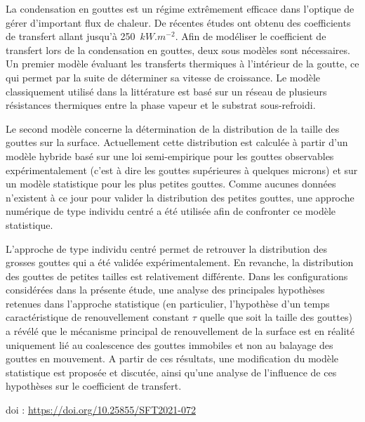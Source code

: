 {\normalsize
La condensation en gouttes est un régime extrêmement efficace dans l'optique de gérer d'important flux de chaleur. De récentes études ont obtenu des coefficients de transfert allant jusqu'à 250~$\unit{kW.m^{-2}}$. Afin de modéliser le coefficient de transfert lors de la condensation en gouttes, deux sous modèles sont nécessaires. Un premier modèle évaluant les transferts thermiques à l'intérieur de la goutte, ce qui permet par la suite de déterminer sa vitesse de croissance. Le modèle classiquement utilisé dans la littérature est basé sur un réseau de plusieurs résistances thermiques entre la phase vapeur et le substrat sous-refroidi. 



Le second modèle concerne la détermination de la distribution de la taille des gouttes sur la surface. Actuellement cette distribution est calculée à partir d'un modèle hybride basé sur une loi semi-empirique pour les gouttes observables expérimentalement (c'est à dire les gouttes supérieures à quelques microns) et sur un modèle statistique pour les plus petites gouttes. Comme aucunes données n'existent à ce jour pour valider la distribution des petites gouttes, une approche numérique de type individu centré a été utilisée afin de confronter ce modèle statistique. 



L'approche de type individu centré permet de retrouver la distribution des grosses gouttes qui a été validée expérimentalement. En revanche, la distribution des gouttes de petites tailles est relativement différente. Dans les configurations considérées dans la présente étude, une analyse des principales hypothèses retenues dans l'approche statistique (en particulier, l'hypothèse d'un temps caractéristique de renouvellement constant $\tau$ quelle que soit la taille des gouttes) a révélé que le mécanisme principal de renouvellement de la surface est en réalité uniquement lié au coalescence des gouttes immobiles et non au balayage des gouttes en mouvement. A partir de ces résultats, une modification du modèle statistique est proposée et discutée, ainsi qu'une analyse de l'influence de ces hypothèses sur le coefficient de transfert.

 \vfill doi : \url{https://doi.org/10.25855/SFT2021-072}

}
 
